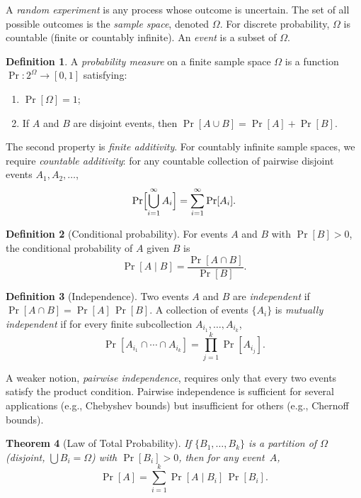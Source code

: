 \documentclass[twoside,12pt]{book}
\theoremstyle{plain}
\newtheorem{theorem}{Theorem}[chapter]
\theoremstyle{definition}
\newtheorem{definition}[theorem]{Definition}
\theoremstyle{remark}
\begin{document}
A \emph{random experiment} is any process whose outcome is uncertain.
The set of all possible outcomes is the \emph{sample space}, denoted
$\Omega$. For discrete probability, $\Omega$ is countable (finite or
countably infinite). An \emph{event} is a subset of $\Omega$.

\begin{definition}
A \emph{probability measure} on a finite sample space $\Omega$ is a
function $\Pr: 2^{\Omega} \to [0,1]$ satisfying:
\begin{enumerate}
\item $\Pr[\Omega] = 1$;
\item If $A$ and $B$ are disjoint events, then
      $\Pr[A \cup B] = \Pr[A] + \Pr[B]$.
\end{enumerate}
\end{definition}

The second property is \emph{finite additivity}. For countably infinite
sample spaces, we require \emph{countable additivity}: for any countable
collection of pairwise disjoint events $A_1, A_2, \ldots$,
\[
\Pr\Bigl[\bigcup_{i=1}^{\infty} A_i\Bigr] = \sum_{i=1}^{\infty} \Pr[A_i].
\]

\begin{definition}[Conditional probability]
For events $A$ and $B$ with $\Pr[B] > 0$, the conditional probability of
$A$ given $B$ is
\[
\Pr[A \mid B] = \frac{\Pr[A \cap B]}{\Pr[B]}.
\]
\end{definition}

\begin{definition}[Independence]
Two events $A$ and $B$ are \emph{independent} if
$\Pr[A \cap B] = \Pr[A]\,\Pr[B]$.
A collection of events $\{A_i\}$ is \emph{mutually independent} if for
every finite subcollection $A_{i_1}, \ldots, A_{i_k}$,
\[
\Pr[A_{i_1} \cap \cdots \cap A_{i_k}] = \prod_{j=1}^{k} \Pr[A_{i_j}].
\]
\end{definition}

A weaker notion, \emph{pairwise independence}, requires only that every
two events satisfy the product condition. Pairwise independence is
sufficient for several applications (e.g., Chebyshev bounds) but
insufficient for others (e.g., Chernoff bounds).

\begin{theorem}[Law of Total Probability]
If $\{B_1, \ldots, B_k\}$ is a partition of $\Omega$ (disjoint,
$\bigcup B_i = \Omega$) with $\Pr[B_i] > 0$, then for any event~$A$,
\[
\Pr[A] = \sum_{i=1}^{k} \Pr[A \mid B_i]\,\Pr[B_i].
\]
\end{theorem}
\end{document}
